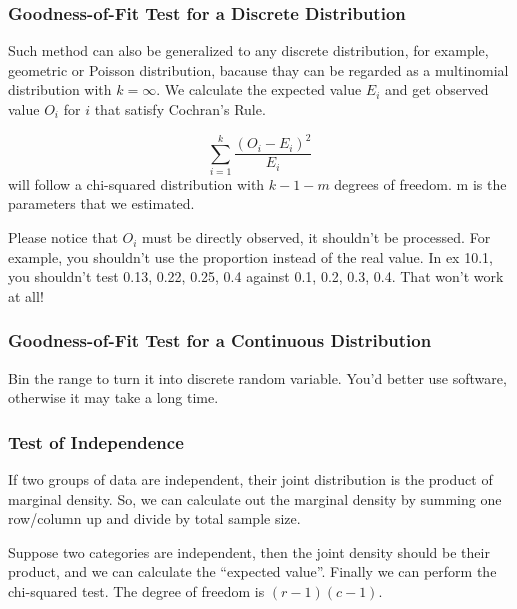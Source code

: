 \documentclass{beamer}
\begin{document}
\begin{frame}
    \frametitle{Goodness-of-Fit Test for a Discrete Distribution}

    Such method can also be generalized to any discrete distribution, for example, geometric or Poisson distribution, bacause thay can be regarded as a multinomial distribution with $k=\infty$. We calculate the expected value $E_i$ and get observed value $O_i$ for $i$ that satisfy Cochran's Rule.\par
    \vspace{0.3cm}
    \[\sum\limits_{i=1}^{k}\frac{(O_i-E_i)^2}{E_i}\]
    will follow a chi-squared distribution with $k-1-m$ degrees of freedom. m is the parameters that we estimated.\par
    Please notice that $O_i$ must be directly observed, it shouldn't be processed. For example, you shouldn't use the proportion instead of the real value. In ex 10.1, you shouldn't test 0.13, 0.22, 0.25, 0.4 against 0.1, 0.2, 0.3, 0.4. That won't work at all!
    

\end{frame}

\begin{frame}
    \frametitle{Goodness-of-Fit Test for a Continuous Distribution}
    Bin the range to turn it into discrete random variable. You'd better use software, otherwise it may take a long time.
    

\end{frame}

\begin{frame}
    \frametitle{Test of Independence}

    If two groups of data are independent, their joint distribution is the product of marginal density. So, we can calculate out the marginal density by summing one row/column up and divide by total sample size.\par
    Suppose two categories are independent, then the joint density should be their product, and we can calculate the ``expected value''. Finally we can perform the chi-squared test. The degree of freedom is $(r-1)(c-1)$.

\end{frame}
\end{document}

